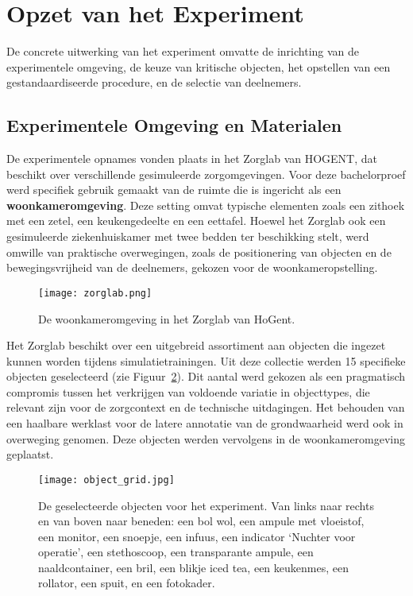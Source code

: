 \section{Opzet van het Experiment}

De concrete uitwerking van het experiment omvatte de inrichting van de experimentele omgeving, de keuze van kritische objecten, het opstellen van een gestandaardiseerde procedure, en de selectie van deelnemers.

\subsection{Experimentele Omgeving en Materialen}

De experimentele opnames vonden plaats in het Zorglab van HOGENT, dat beschikt over verschillende gesimuleerde zorgomgevingen. 
Voor deze bachelorproef werd specifiek gebruik gemaakt van de ruimte die is ingericht als een \textbf{woonkameromgeving}. 
Deze setting omvat typische elementen zoals een zithoek met een zetel, een keukengedeelte en een eettafel. 
Hoewel het Zorglab ook een gesimuleerde ziekenhuiskamer met twee bedden ter beschikking stelt, werd omwille van praktische overwegingen, 
zoals de positionering van objecten en de bewegingsvrijheid van de deelnemers, gekozen voor de woonkameropstelling.

\begin{figure}[H]
  \centering
  \texttt{[image: zorglab.png]}
  \caption[]{\label{fig:zorglab} De woonkameromgeving in het Zorglab van HoGent.}
\end{figure}

Het Zorglab beschikt over een uitgebreid assortiment aan objecten die ingezet kunnen worden tijdens simulatietrainingen. 
Uit deze collectie werden 15 specifieke objecten geselecteerd (zie Figuur~\ref{fig:object_grid}).
Dit aantal werd gekozen als een pragmatisch compromis tussen het verkrijgen van voldoende variatie in objecttypes, 
die relevant zijn voor de zorgcontext en de technische uitdagingen. Het behouden van een haalbare werklast voor de latere annotatie van de grondwaarheid werd ook in overweging genomen.
Deze objecten werden vervolgens in de woonkameromgeving geplaatst.

\begin{figure}[H]
  \centering
  \texttt{[image: object\_grid.jpg]}
  \caption[]{\label{fig:object_grid} De geselecteerde objecten voor het experiment. Van links naar rechts en van boven naar beneden: 
  een bol wol, een ampule met vloeistof, een monitor, een snoepje, een infuus, een indicator `Nuchter voor operatie', een stethoscoop, een transparante ampule, een naaldcontainer, een bril, een blikje iced tea, een keukenmes, een rollator, een spuit, en een fotokader. 
  }
\end{figure}

